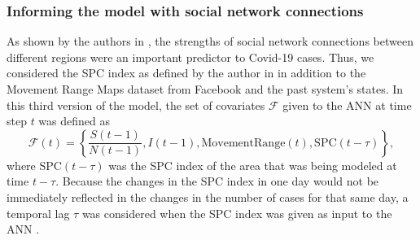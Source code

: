 \subsubsection{Informing the model with social network connections}

As shown by the authors in \cite{kuchlerGeographicSpreadCOVID192020}, the strengths of social network connections between different regions were an important predictor to Covid-19 cases.
Thus, we considered the \gls{SPC} index as defined by the author in \cite{kuchlerGeographicSpreadCOVID192020} in addition to the Movement Range Maps dataset from Facebook and the past system's states.
In this third version of the model, the set of covariates $\mathcal{F}$ given to the \gls{ANN} at time step $t$ was defined as
\begin{equation*}
    \mathcal{F}(t) = \left\lbrace \frac{S(t-1)}{N(t-1)}, I(t-1), \text{MovementRange}(t), \text{SPC}(t - \tau) \right\rbrace,
\end{equation*}
where $\text{SPC}(t - \tau)$ was the \gls{SPC} index of the area that was being modeled at time $t - \tau$.
Because the changes in the \gls{SPC} index in one day would not be immediately reflected in the changes in the number of cases for that same day, a temporal lag $\tau$ was considered when the \gls{SPC} index was given as input to the \gls{ANN} \cite{kuchlerGeographicSpreadCOVID192020}.